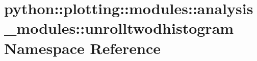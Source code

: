 \hypertarget{namespacepython_1_1plotting_1_1modules_1_1analysis__modules_1_1unrolltwodhistogram}{
\section{python::plotting::modules::analysis\_\-modules::unrolltwodhistogram Namespace Reference}
\label{namespacepython_1_1plotting_1_1modules_1_1analysis__modules_1_1unrolltwodhistogram}
}
